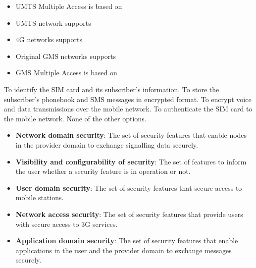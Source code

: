 \begin{solution}
    \begin{itemize}
        \item UMTS Multiple Access is based on 
        \item UMTS network supports 
        \item 4G networks supports 
        \item Original GMS networks supports 
        \item GMS Multiple Access is based on 
    \end{itemize}
\end{solution}

\begin{checkboxes}
    \choice To identify the SIM card and its subscriber's information.
    \choice To store the subscriber's phonebook and SMS messages in encrypted format.
    \choice To encrypt voice and data transmissions over the mobile network.
    \CorrectChoice To authenticate the SIM card to the mobile network.
    \choice None of the other options.
\end{checkboxes}

\begin{solution}
    \begin{itemize}
        \item \textbf{Network domain security}: The set of security features that enable nodes in the provider domain to exchange signalling data securely.
        \item \textbf{Visibility and configurability of security}: The set of features to inform the user whether a security feature is in operation or not.
        \item \textbf{User domain security}: The set of security features that secure access to mobile stations.
        \item \textbf{Network access security}: The set of security features that provide users with secure access to 3G services.
        \item \textbf{Application domain security}: The set of security features that enable applications in the user and the provider domain to exchange messages securely.
    \end{itemize}
\end{solution}


